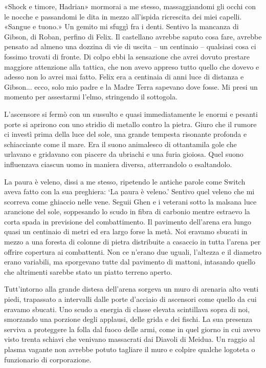 «Shock e timore, Hadrian» mormorai a me stesso, massaggiandomi gli occhi
con le nocche e passandomi le dita in mezzo all'ispida ricrescita dei
miei capelli. «Sangue e tuono.» Un gemito mi sfuggì fra i denti. Sentivo
la mancanza di Gibson, di Roban, perfino di Felix. Il castellano avrebbe
saputo cosa fare, avrebbe pensato ad almeno una dozzina di vie di uscita
-- un centinaio -- qualsiasi cosa ci fossimo trovati di fronte. Di colpo
ebbi la sensazione che avrei dovuto prestare maggiore attenzione alla
tattica, che non avevo appreso tutto quello che dovevo e adesso non lo
avrei mai fatto. Felix era a centinaia di anni luce di distanza e
Gibson... ecco, solo mio padre e la Madre Terra sapevano dove fosse. Mi
presi un momento per assestarmi l'elmo, stringendo il sottogola.

L'ascensore si fermò con un sussulto e quasi immediatamente le enormi e
pesanti porte si aprirono con uno stridio di metallo contro la pietra.
Giuro che il rumore ci investì prima della luce del sole, una grande
tempesta risonante profonda e schiacciante come il mare. Era il suono
animalesco di ottantamila gole che urlavano e gridavano con piacere da
ubriachi e una furia gioiosa. Quel suono influenzava ciascun uomo in
maniera diversa, atterrandolo o esaltandolo.

La paura è veleno, dissi a me stesso, ripetendo le antiche parole come
Switch aveva fatto con la sua preghiera: `La paura è veleno.' Sentivo
quel veleno che mi scorreva come ghiaccio nelle vene. Seguii Ghen e i
veterani sotto la malsana luce arancione del sole, soppesando lo scudo
in fibra di carbonio mentre estraevo la corta spada in previsione del
combattimento. Il pavimento dell'arena era lungo quasi un centinaio di
metri ed era largo forse la metà. Noi eravamo sbucati in mezzo a una
foresta di colonne di pietra distribuite a casaccio in tutta l'arena per
offrire copertura ai combattenti. Non ce n'erano due uguali, l'altezza e
il diametro erano variabili, ma sporgevano tutte dal pavimento di
mattoni, intasando quello che altrimenti sarebbe stato un piatto terreno
aperto.

Tutt'intorno alla grande distesa dell'arena sorgeva un muro di arenaria
alto venti piedi, trapassato a intervalli dalle porte d'acciaio di
ascensori come quello da cui eravamo sbucati. Uno scudo a energia di
classe elevata scintillava sopra di noi, smorzando una porzione degli
applausi, delle grida e dei fischi. La sua presenza serviva a proteggere
la folla dal fuoco delle armi, come in quel giorno in cui avevo visto
trenta schiavi che venivano massacrati dai Diavoli di Meidua. Un raggio
al plasma vagante non avrebbe potuto tagliare il muro e colpire qualche
logoteta o funzionario di corporazione.


